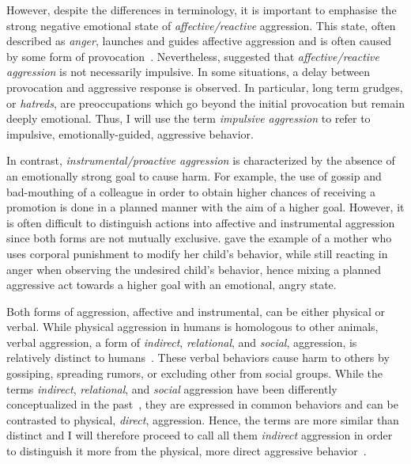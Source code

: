 However, despite the differences in terminology, it is important to emphasise the strong negative emotional state of \textit{affective/reactive} aggression.
This state, often described as \textit{anger}, launches and guides affective aggression  and is often caused by some form of provocation~\cite{Geen2001}.
Nevertheless, \citet{Frijda1994} suggested that \textit{affective/reactive aggression} is not necessarily impulsive.
In some situations, a delay between provocation and aggressive response is observed. 
In particular, long term grudges, or \textit{hatreds}, are preoccupations which go beyond the initial provocation but remain deeply emotional.
Thus, I will use the term \textit{impulsive aggression} to refer to impulsive, emotionally-guided, aggressive behavior.

In contrast, \textit{instrumental/proactive aggression} is characterized by the absence of an emotionally strong goal to cause harm.
For example, the use of gossip and bad-mouthing of a colleague in order to obtain higher chances of receiving a promotion is done in a planned manner with the aim of a higher goal.
However, it is often difficult to distinguish actions into affective and instrumental aggression since both forms are not mutually exclusive.
\citet{Geen2001} gave the example of a mother who uses corporal punishment to modify her child's behavior, while still reacting in anger when observing the undesired child's behavior,
hence mixing a planned aggressive act towards a higher goal with an emotional, angry state.

Both forms of aggression, affective and instrumental, can be either physical or verbal.
While physical aggression in humans is homologous to other animals, verbal aggression, a form of \textit{indirect}, \textit{relational}, and \textit{social}, aggression, is relatively distinct to humans~\cite{Archer2005}.
These verbal behaviors cause harm to others by gossiping, spreading rumors, or excluding other from social groups.
While the terms \textit{indirect}, \textit{relational}, and \textit{social} aggression have been differently conceptualized in the past~\cite{Archer2001}, they are expressed in common behaviors and can be contrasted to physical, \textit{direct}, aggression.
Hence, the terms are more similar than distinct and I will therefore proceed to call all them \textit{indirect} aggression in order to distinguish it more from the physical, more direct aggressive behavior~\cite{Archer2005}.

